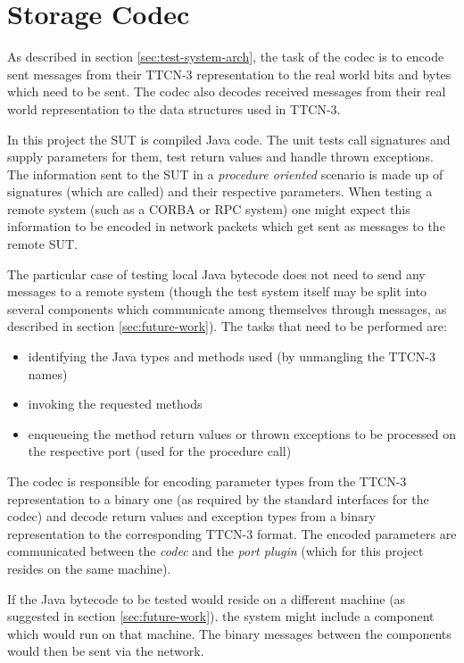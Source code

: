 \section{Storage Codec}
\label{sec:storage-codec}

As described in section \ref{sec:test-system-arch},
the task of the codec is to encode sent messages
from their \ac{TTCN-3} representation
to the real world bits and bytes which need to be sent.
The codec also decodes received messages from their real world representation
to the data structures used in \ac{TTCN-3}.

In this project the \ac{SUT} is compiled Java code.
The unit tests call signatures and supply parameters for them,
test return values and handle thrown exceptions.
The information sent to the \ac{SUT} in a \emph{procedure oriented} scenario
is made up of signatures (which are called) and their respective parameters.
When testing a remote system (such as a \ac{CORBA} or \ac{RPC} system)
one might expect this information to be encoded in network packets
which get sent as messages to the remote \ac{SUT}.

The particular case of testing local Java bytecode
does not need to send any messages to a remote system
(though the test system itself may be split into several components
which communicate among themselves through messages,
as described in section \ref{sec:future-work}).
The tasks that need to be performed are:
\begin{itemize}
\item identifying the Java types and methods used
(by unmangling the \ac{TTCN-3} names)
\item invoking the requested methods
\item enqueueing the method return values or thrown exceptions
to be processed on the respective port (used for the procedure call)
\end{itemize}

The codec is responsible for encoding parameter types
from the \ac{TTCN-3} representation to a binary one
(as required by the standard interfaces for the codec)
and decode return values and exception types from a binary representation
to the corresponding \ac{TTCN-3} format.
The encoded parameters are communicated between the \emph{codec}
and the \emph{port plugin}
(which for this project resides on the same machine).

If the Java bytecode to be tested would reside on a different machine
(as suggested in section \ref{sec:future-work}).
the system might include a component which would run on that machine.
The binary messages between the components
would then be sent via the network.

